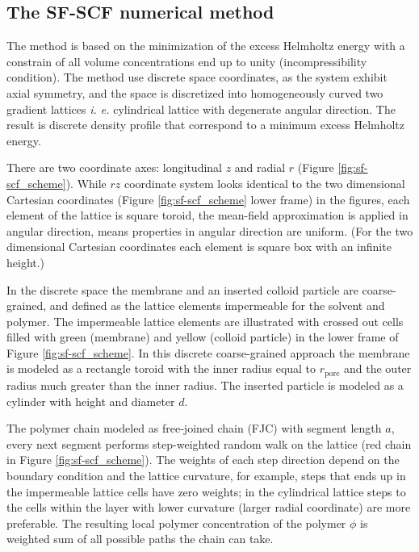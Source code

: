 \documentclass[10pt, a4paper]{article}
\begin{document}
\subsection*{The SF-SCF numerical method}
\begin{multicols}{2}


The method is based on the minimization of the excess Helmholtz energy with a constrain of all volume concentrations end up to unity (incompressibility condition).
The method use discrete space coordinates, as the system exhibit axial symmetry, and the space is discretized into homogeneously curved two gradient lattices \emph{i. e.} cylindrical lattice with degenerate angular direction.
The result is discrete density profile that correspond to a minimum excess Helmholtz energy.

There are two coordinate axes: longitudinal $z$ and radial $r$ (Figure \ref{fig:sf-scf_scheme}). 
While $rz$ coordinate system looks identical to the two dimensional Cartesian coordinates (Figure \ref{fig:sf-scf_scheme} lower frame) in the figures, each element of the lattice is square toroid, the mean-field approximation is applied in angular direction, means properties in angular direction are uniform.
(For the two dimensional Cartesian coordinates each element is square box with an infinite height.)

In the discrete space the membrane and an inserted colloid particle are coarse-grained, and defined as the lattice elements impermeable for the solvent and polymer.
The impermeable lattice elements are illustrated with crossed out cells filled with green (membrane) and yellow (colloid particle) in  the lower frame of Figure \ref{fig:sf-scf_scheme}.
In this discrete coarse-grained approach the membrane is modeled as a rectangle toroid with the inner radius equal to $r_{\textrm{pore}}$ and the outer radius much greater than the inner radius.
The inserted particle is modeled as a cylinder with height and diameter $d$.

The polymer chain modeled as free-joined chain (FJC) with segment length $a$, every next segment performs step-weighted random walk on the lattice (red chain in Figure \ref{fig:sf-scf_scheme}).
The weights of each step direction depend on the boundary condition and the lattice curvature, for example, steps that ends up in the impermeable lattice cells have zero weights; in the cylindrical lattice steps to the cells within the layer with lower curvature (larger radial coordinate) are more preferable.
The resulting local polymer concentration of the polymer $\phi$ is weighted sum of all possible paths the chain can take.


\end{multicols}
\end{document}
